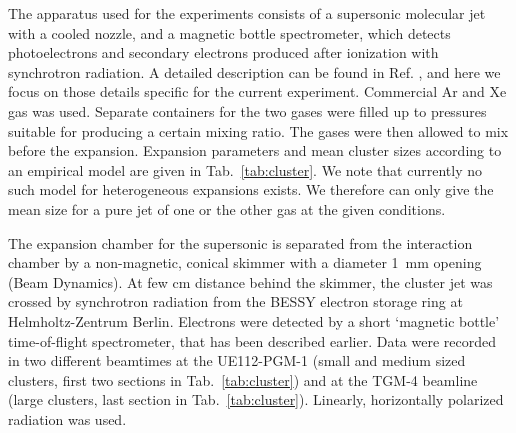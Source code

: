 %
%
The apparatus used for the experiments consists of a supersonic molecular jet with a cooled nozzle, and a magnetic bottle spectrometer, which detects photoelectrons and secondary electrons produced after ionization with synchrotron radiation.\cite{arion} A detailed description can be found in Ref. , and here we focus on those details specific for the current experiment. Commercial Ar and Xe gas was used. Separate containers for the two gases were filled up to pressures suitable for producing a certain mixing ratio. The gases were then allowed to mix before the expansion. Expansion parameters and mean cluster sizes according to an empirical model are given in Tab.\ \ref{tab:cluster}. We note that currently no such  model for heterogeneous expansions exists. We therefore can only give the mean size for a pure jet of one or the other gas at the given conditions. 

The expansion chamber for the supersonic is separated from the interaction chamber by a non-magnetic, conical skimmer with a diameter 1~mm opening (Beam Dynamics). At few cm distance behind the skimmer, the cluster jet was crossed by synchrotron radiation from the BESSY electron storage ring at Helmholtz-Zentrum Berlin. Electrons were detected by a short `magnetic bottle' time-of-flight spectrometer, that has been described earlier.\cite{mucke_review} Data were recorded in two different beamtimes at the UE112-PGM-1 (small and medium sized clusters, first two sections in Tab.\ \ref{tab:cluster}) and at the TGM-4 beamline (large clusters, last section in Tab.\ \ref{tab:cluster}). Linearly, horizontally polarized radiation was used.



